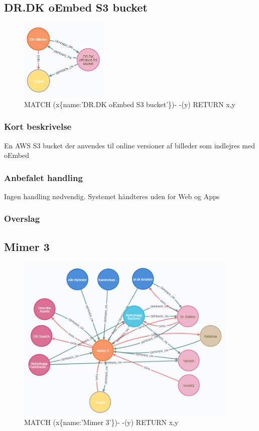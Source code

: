 \documentclass{article}
\begin{document}
\subsection{DR.DK oEmbed S3 bucket}
\begin{figure}[h]
\includegraphics[width=120pt]{S3Bucket.PNG}
\caption{MATCH (x\{name:'DR.DK oEmbed S3 bucket'\})- -(y) RETURN x,y}
\end{figure}
\subsubsection{Kort beskrivelse}
En AWS S3 bucket der anvendes til online versioner af billeder som indlejres med oEmbed
\subsubsection{Anbefalet handling}
Ingen handling nødvendig. Systemet håndteres uden for Web og Apps
\subsubsection{Overslag}


\subsection{Mimer 3}
\begin{figure}[h]
\includegraphics[width=300pt]{Mimer3.PNG}
\caption{MATCH (x\{name:'Mimer 3'\})- -(y) RETURN x,y}
\end{figure}
\end{document}

